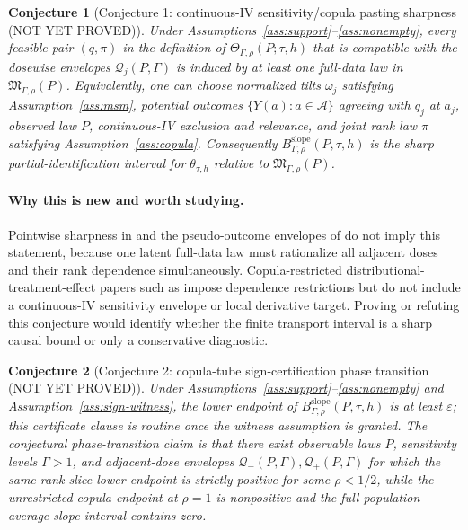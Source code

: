 \documentclass[11pt]{article}
\theoremstyle{definition}
\theoremstyle{plain}
\newtheorem{conjecture}{Conjecture}
\theoremstyle{remark}
\begin{document}
\begin{conjecture}[Conjecture 1: continuous-IV sensitivity/copula pasting sharpness (NOT YET PROVED)]\label{conj:pasting-sharpness}
Under Assumptions~\ref{ass:support}--\ref{ass:nonempty}, every feasible pair \((q,\pi)\) in the definition of \(\Theta_{\Gamma,\rho}(P;\tau,h)\) that is compatible with the dosewise envelopes \(\mathcal Q_j(P,\Gamma)\) is induced by at least one full-data law in \(\mathfrak M_{\Gamma,\rho}(P)\).  Equivalently, one can choose normalized tilts \(\omega_j\) satisfying Assumption~\ref{ass:msm}, potential outcomes \(\{Y(a):a\in\mathcal A\}\) agreeing with \(q_j\) at \(a_j\), observed law \(P\), continuous-IV exclusion and relevance, and joint rank law \(\pi\) satisfying Assumption~\ref{ass:copula}.  Consequently \(B_{\Gamma,\rho}^{\mathrm{slope}}(P,\tau,h)\) is the sharp partial-identification interval for \(\theta_{\tau,h}\) relative to \(\mathfrak M_{\Gamma,\rho}(P)\).
\end{conjecture}

\paragraph{Why this is new and worth studying.}
Pointwise sharpness in \citet{BaitairianSebastienJreichKatsahianGuilloux2025} and the pseudo-outcome envelopes of \citet{DalalTchetgenTchetgen2025} do not imply this statement, because one latent full-data law must rationalize all adjacent doses and their rank dependence simultaneously.  Copula-restricted distributional-treatment-effect papers such as \citet{MadigasekaraPoskittZhangZhao2024} impose dependence restrictions but do not include a continuous-IV sensitivity envelope or local derivative target.  Proving or refuting this conjecture would identify whether the finite transport interval is a sharp causal bound or only a conservative diagnostic.

\begin{conjecture}[Conjecture 2: copula-tube sign-certification phase transition (NOT YET PROVED)]\label{conj:sign-phase}
Under Assumptions~\ref{ass:support}--\ref{ass:nonempty} and Assumption~\ref{ass:sign-witness}, the lower endpoint of \(B_{\Gamma,\rho}^{\mathrm{slope}}(P,\tau,h)\) is at least \(\varepsilon\); this certificate clause is routine once the witness assumption is granted.  The conjectural phase-transition claim is that there exist observable laws \(P\), sensitivity levels \(\Gamma>1\), and adjacent-dose envelopes \(\mathcal Q_-(P,\Gamma),\mathcal Q_+(P,\Gamma)\) for which the same rank-slice lower endpoint is strictly positive for some \(\rho<1/2\), while the unrestricted-copula endpoint at \(\rho=1\) is nonpositive and the full-population average-slope interval contains zero.
\end{conjecture}
\end{document}
